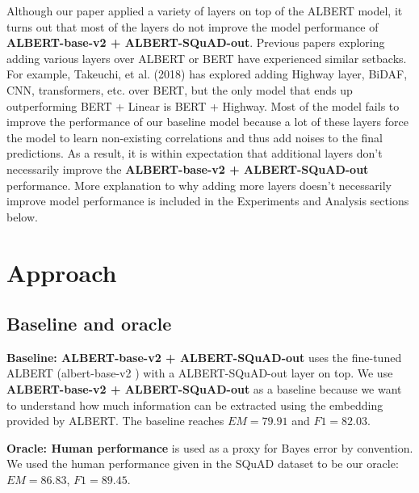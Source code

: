 \documentclass{article}
\begin{document}
Although our paper applied a variety of layers on top of the ALBERT model, it turns out that most of the layers do not improve the model performance of \textbf{ALBERT-base-v2 + ALBERT-SQuAD-out}. Previous papers exploring adding various layers over ALBERT or BERT have experienced similar setbacks. \citep{zhang_and_xu} \citep{haoshen_recommended_report} For example, Takeuchi, et al. (2018) has explored adding Highway layer, BiDAF, CNN, transformers, etc. over BERT, but the only model that ends up outperforming BERT + Linear is BERT + Highway. Most of the model fails to improve the performance of our baseline model because a lot of these layers force the model to learn non-existing correlations and thus add noises to the final predictions. As a result, it is within expectation that additional layers don't necessarily improve the \textbf{ALBERT-base-v2 + ALBERT-SQuAD-out} performance. More explanation to why adding more layers doesn't necessarily improve model performance is included in the Experiments and Analysis sections below.

\section{Approach}

\subsection{Baseline and oracle}

\textbf{Baseline: ALBERT-base-v2 + ALBERT-SQuAD-out} uses the fine-tuned ALBERT (albert-base-v2 \citep{albert}) with a ALBERT-SQuAD-out layer on top. We use \textbf{ALBERT-base-v2 + ALBERT-SQuAD-out} as a baseline because we want to understand how much information can be extracted using the embedding provided by ALBERT. The baseline reaches $EM = 79.91$ and $F1 = 82.03$.

\textbf{Oracle: Human performance} is used as a proxy for Bayes error by convention. We used the human performance given in the SQuAD dataset to be our oracle: $EM = 86.83$, $F1 = 89.45$. \citep{SQuAD}
\end{document}
